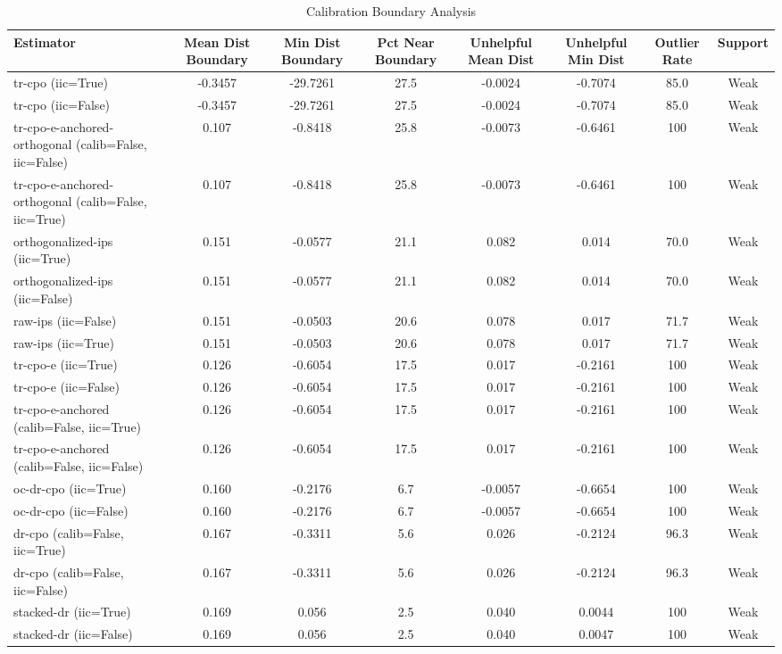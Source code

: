 \begin{table}[htbp]
\centering
\caption{Calibration Boundary Analysis}
\label{tab:A5}
\begin{tabular}{l|ccccccc}
\toprule
Estimator & Mean Dist Boundary & Min Dist Boundary & Pct Near Boundary & Unhelpful Mean Dist & Unhelpful Min Dist & Outlier Rate & Support \\
\midrule
tr-cpo (iic=True) & -0.3457 & -29.7261 & 27.5 & -0.0024 & -0.7074 & 85.0 & Weak \\
tr-cpo (iic=False) & -0.3457 & -29.7261 & 27.5 & -0.0024 & -0.7074 & 85.0 & Weak \\
tr-cpo-e-anchored-orthogonal (calib=False, iic=False) & 0.107 & -0.8418 & 25.8 & -0.0073 & -0.6461 & 100 & Weak \\
tr-cpo-e-anchored-orthogonal (calib=False, iic=True) & 0.107 & -0.8418 & 25.8 & -0.0073 & -0.6461 & 100 & Weak \\
orthogonalized-ips (iic=True) & 0.151 & -0.0577 & 21.1 & 0.082 & 0.014 & 70.0 & Weak \\
orthogonalized-ips (iic=False) & 0.151 & -0.0577 & 21.1 & 0.082 & 0.014 & 70.0 & Weak \\
raw-ips (iic=False) & 0.151 & -0.0503 & 20.6 & 0.078 & 0.017 & 71.7 & Weak \\
raw-ips (iic=True) & 0.151 & -0.0503 & 20.6 & 0.078 & 0.017 & 71.7 & Weak \\
tr-cpo-e (iic=True) & 0.126 & -0.6054 & 17.5 & 0.017 & -0.2161 & 100 & Weak \\
tr-cpo-e (iic=False) & 0.126 & -0.6054 & 17.5 & 0.017 & -0.2161 & 100 & Weak \\
tr-cpo-e-anchored (calib=False, iic=True) & 0.126 & -0.6054 & 17.5 & 0.017 & -0.2161 & 100 & Weak \\
tr-cpo-e-anchored (calib=False, iic=False) & 0.126 & -0.6054 & 17.5 & 0.017 & -0.2161 & 100 & Weak \\
oc-dr-cpo (iic=True) & 0.160 & -0.2176 & 6.7 & -0.0057 & -0.6654 & 100 & Weak \\
oc-dr-cpo (iic=False) & 0.160 & -0.2176 & 6.7 & -0.0057 & -0.6654 & 100 & Weak \\
dr-cpo (calib=False, iic=True) & 0.167 & -0.3311 & 5.6 & 0.026 & -0.2124 & 96.3 & Weak \\
dr-cpo (calib=False, iic=False) & 0.167 & -0.3311 & 5.6 & 0.026 & -0.2124 & 96.3 & Weak \\
stacked-dr (iic=True) & 0.169 & 0.056 & 2.5 & 0.040 & 0.0044 & 100 & Weak \\
stacked-dr (iic=False) & 0.169 & 0.056 & 2.5 & 0.040 & 0.0047 & 100 & Weak \\

\end{tabular}
\end{table}
